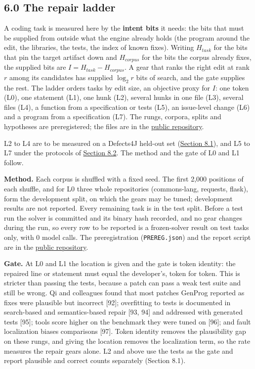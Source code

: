 \documentclass[10pt,letterpaper]{article}
\begin{document}
\subsection{6.0 The repair ladder}\label{the-repair-ladder}

A coding task is measured here by the \textbf{intent bits} it needs: the
bits that must be supplied from outside what the engine already holds
(the program around the edit, the libraries, the tests, the index of
known fixes). Writing \(H_{task}\) for the bits that pin the target
artifact down and \(H_{corpus}\) for the bits the corpus already fixes,
the supplied bits are \(I = H_{task} - H_{corpus}\). A gear that ranks
the right edit at rank \(r\) among its candidates has supplied
\(\log_2 r\) bits of search, and the gate supplies the rest. The ladder
orders tasks by edit size, an objective proxy for \(I\): one token (L0),
one statement (L1), one hunk (L2), several hunks in one file (L3),
several files (L4), a function from a specification or tests (L5), an
issue-level change (L6) and a program from a specification (L7). The
rungs, corpora, splits and hypotheses are preregistered; the files are
in the
\href{https://github.com/openIE-dev/openie-research-experiments/tree/main/rce/bench/ladder/}{public
repository}.

L2 to L4 are to be measured on a Defects4J held-out set
(\href{https://research.openie.dev/papers/rce/\#81-defects4j}{Section
8.1}), and L5 to L7 under the protocols of
\href{https://research.openie.dev/papers/rce/\#82-swe-bench-lite-offline}{Section
8.2}. The method and the gate of L0 and L1 follow.

\textbf{Method.} Each corpus is shuffled with a fixed seed. The first
2,000 positions of each shuffle, and for L0 three whole repositories
(commons-lang, requests, flask), form the development split, on which
the gears may be tuned; development results are not reported. Every
remaining task is in the test split. Before a test run the solver is
committed and its binary hash recorded, and no gear changes during the
run, so every row to be reported is a frozen-solver result on test tasks
only, with 0 model calls. The preregistration (\texttt{PREREG.json}) and
the report script are in the
\href{https://github.com/openIE-dev/openie-research-experiments/tree/main/rce/bench/ladder/}{public
repository}.

\textbf{Gate.} At L0 and L1 the location is given and the gate is token
identity: the repaired line or statement must equal the developer's,
token for token. This is stricter than passing the tests, because a
patch can pass a weak test suite and still be wrong. Qi and colleagues
found that most patches GenProg reported as fixes were plausible but
incorrect {[}92{]}; overfitting to tests is documented in search-based
and semantics-based repair {[}93, 94{]} and addressed with generated
tests {[}95{]}; tools score higher on the benchmark they were tuned on
{[}96{]}; and fault localization biases comparisons {[}97{]}. Token
identity removes the plausibility gap on these rungs, and giving the
location removes the localization term, so the rate measures the repair
gears alone. L2 and above use the tests as the gate and report plausible
and correct counts separately (Section 8.1).
\end{document}
